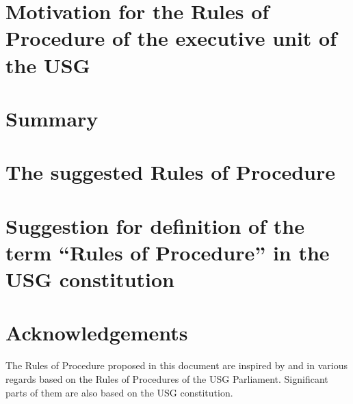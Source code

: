 \documentclass[a4paper,10pt]{article}
\begin{document}
 \maketitle
 \thispagestyle{main}
 \tableofcontents
%	 
  \section[Motivation]{Motivation for the Rules of Procedure of the executive unit of the USG}
		
	\section{Summary}
		\newpage
  \section{The suggested Rules of Procedure}
		
  \section[Suggested definition of ``Rules of Procedure'']{Suggestion for definition of the term ``Rules of Procedure'' in the USG constitution}
		
%	 
	\section*{Acknowledgements}
		The Rules of Procedure proposed in this document are inspired by and in various regards based on the Rules of Procedures of the USG Parliament. Significant parts of them are also based on the USG constitution.
 \label{theEnd}
\end{document}
